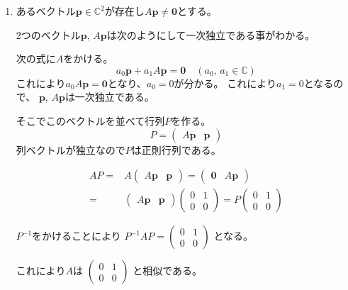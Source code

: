 \documentclass[12pt,b5paper]{ltjsarticle}
\begin{document}
\begin{enumerate}
 \item
      あるベクトル$\bm{p}\in\mathbb{C}^2$が存在し$A\bm{p}\ne \bm{0}$とする。

      2つのベクトル$\bm{p},\,A\bm{p}$は次のようにして一次独立である事がわかる。

      次の式に$A$をかける。
      \begin{equation}
       a_0\bm{p} + a_1A\bm{p} =\bm{0} \quad (a_0,\,a_1\in\mathbb{C})
      \end{equation}
      これにより$a_0A\bm{p}=\bm{0}$となり、$a_0=0$が分かる。
      これにより$a_1=0$となるので、
      $\bm{p},\,A\bm{p}$は一次独立である。

      そこでこのベクトルを並べて行列$P$を作る。
      \begin{equation}
       P = \begin{pmatrix} A\bm{p} & \bm{p} \end{pmatrix}
      \end{equation}
      列ベクトルが独立なので$P$は正則行列である。

      \begin{align}
       AP =& A\begin{pmatrix} A\bm{p} & \bm{p} \end{pmatrix}
       = \begin{pmatrix} \bm{0} & A\bm{p} \end{pmatrix}\\
       =& \begin{pmatrix} A\bm{p} & \bm{p} \end{pmatrix}
       \begin{pmatrix} 0 & 1 \\ 0 & 0 \end{pmatrix}
       = P \begin{pmatrix} 0 & 1 \\ 0 & 0 \end{pmatrix}
      \end{align}

      $P^{-1}$をかけることにより
      $P^{-1}AP=\begin{pmatrix} 0 & 1 \\ 0 & 0 \end{pmatrix}$
      となる。

      これにより$A$は
      $\begin{pmatrix} 0 & 1 \\ 0 & 0 \end{pmatrix}$
      と相似である。



\end{enumerate}
\end{document}
